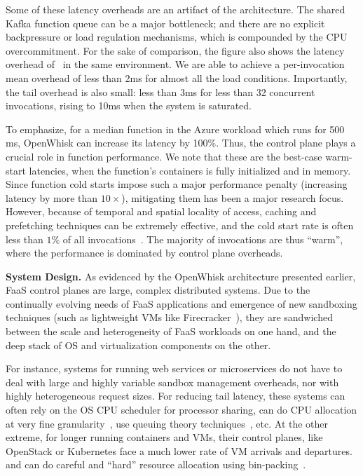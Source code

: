 Some of these latency overheads are an artifact of the architecture. 
The shared Kafka function queue can be a major bottleneck; and there are no explicit backpressure or load regulation mechanisms, which is compounded by the CPU overcommitment. 
%
For the sake of comparison, the figure also shows the latency overhead of \sysname~in the same environment. 
We are able to achieve a per-invocation mean overhead of less than 2ms for almost all the load conditions.
Importantly, the tail overhead is also small: less than 3ms for less than 32 concurrent invocations, rising to 10ms when the system is saturated.


To emphasize, for a median function in the Azure workload which runs for 500 ms, OpenWhisk can increase its latency by 100\%.  
Thus, the control plane plays a crucial role in function performance.
We note that these are the best-case warm-start latencies, when the function's containers is fully initialized and in memory. 
Since function cold starts impose such a major performance penalty (increasing latency by more than $10\times$), mitigating them has been a major research focus. 
However, because of temporal and spatial locality of access, caching and prefetching techniques can be extremely effective, and the cold start rate is often less than $1\% $ of all invocations~\cite{faascache-asplos21}. 
The majority of invocations are thus ``warm'', where the performance is dominated by control plane overheads.

\noindent \textbf{System Design.}
%
As evidenced by the OpenWhisk architecture presented earlier, FaaS control planes are large, complex distributed systems.
Due to the continually evolving needs of FaaS applications and emergence of new sandboxing techniques (such as lightweight VMs like Firecracker~\cite{firecracker-nsdi20}), they are sandwiched between the scale and heterogeneity of FaaS workloads on one hand, and the deep stack of OS and virtualization components on the other. 

For instance, systems for running web services or microservices do not have to deal with large and highly variable sandbox management overheads, nor with highly heterogeneous request sizes.
For reducing tail latency, these systems can often rely on the OS CPU scheduler for processor sharing, can do CPU allocation at very fine granularity~\cite{kaffes2019shinjuku}, use queuing theory techniques~\cite{prekas2017zygos}, etc. 
At the other extreme, for longer running containers and VMs, their control planes, like OpenStack or Kubernetes face a much lower rate of VM arrivals and departures. and can do careful and ``hard'' resource allocation using bin-packing~\cite{cortez2017resource}.


